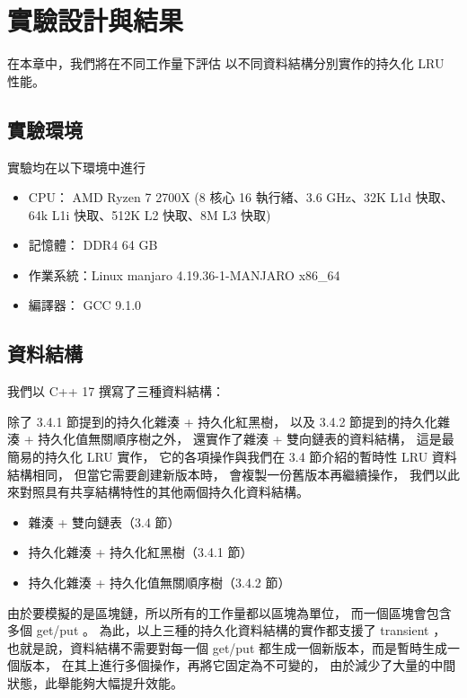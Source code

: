 \chapter{實驗設計與結果}
\label{c:experiment}

在本章中，我們將在不同工作量下評估
以不同資料結構分別實作的持久化 LRU 性能。

\section{實驗環境}
實驗均在以下環境中進行

\begin{itemize}
\item CPU： AMD Ryzen 7 2700X (8 核心 16 執行緒、3.6 GHz、32K L1d 快取、64k L1i 快取、512K L2 快取、8M L3 快取)
\item 記憶體： DDR4 64 GB
\item 作業系統：Linux manjaro 4.19.36-1-MANJARO x86\_64
\item 編譯器： GCC 9.1.0
\end{itemize}

\section{資料結構}

我們以 C++ 17 撰寫了三種資料結構：

除了 3.4.1 節提到的持久化雜湊 + 持久化紅黑樹，
以及 3.4.2 節提到的持久化雜湊 + 持久化值無關順序樹之外，
還實作了雜湊 + 雙向鏈表的資料結構，
這是最簡易的持久化 LRU 實作，
它的各項操作與我們在 3.4 節介紹的暫時性 LRU 資料結構相同，
但當它需要創建新版本時，
會複製一份舊版本再繼續操作，
我們以此來對照具有共享結構特性的其他兩個持久化資料結構。

\begin{itemize}
\item 雜湊 + 雙向鏈表（3.4 節）
\item 持久化雜湊 + 持久化紅黑樹（3.4.1 節）
\item 持久化雜湊 + 持久化值無關順序樹（3.4.2 節）
\end{itemize}

由於要模擬的是區塊鏈，所以所有的工作量都以區塊為單位，
而一個區塊會包含多個 get/put 。
為此，以上三種的持久化資料結構的實作都支援了 transient \cite{puente2017persistence}，
也就是說，資料結構不需要對每一個 get/put 都生成一個新版本，而是暫時生成一個版本，
在其上進行多個操作，再將它固定為不可變的，
由於減少了大量的中間狀態，此舉能夠大幅提升效能。

